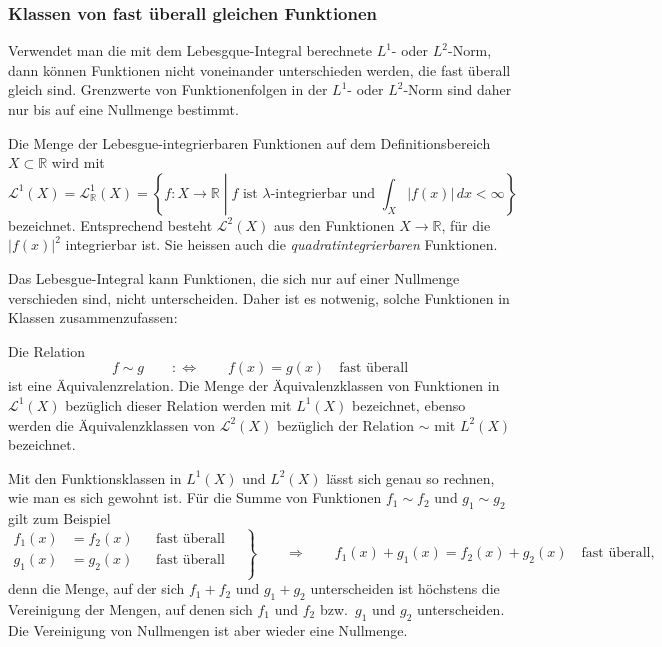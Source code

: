 %
%
\subsubsection{Klassen von fast überall gleichen Funktionen}
Verwendet man die mit dem Lebesgque-Integral berechnete $L^1$- oder
$L^2$-Norm, dann können Funktionen nicht voneinander unterschieden werden,
die fast überall gleich sind.
Grenzwerte von Funktionenfolgen in der $L^1$- oder $L^2$-Norm sind
daher nur bis auf eine Nullmenge bestimmt.

\begin{definition}
Die Menge der Lebesgue-integrierbaren Funktionen auf dem Definitionsbereich
$X\subset\mathbb{R}$ wird mit
\[
\mathscr{L}^1(X)
=
\mathscr{L}^1_{\mathbb{R}}(X)
=
\left\{ f\colon X\to \mathbb{R}
\;\left|\;
\text{$f$ ist $\lambda$-integrierbar und $\int_X|f(x)|\,dx< \infty$}
\right.\right\}
\]
bezeichnet.
%
%
%
%
Entsprechend besteht $\mathscr{L}^2(X)$ aus den Funktionen $X\to \mathbb{R}$,
für die $|f(x)|^2$ integrierbar ist.
Sie heissen auch die {\em quadratintegrierbaren} Funktionen.
\end{definition}

Das Lebesgue-Integral kann Funktionen, die sich nur auf einer Nullmenge
verschieden sind, nicht unterscheiden. 
Daher ist es notwenig, solche Funktionen in Klassen zusammenzufassen:

\begin{definition}
Die Relation
\[
f\sim g
\qquad:\Leftrightarrow \qquad f(x) = g(x)\quad\text{fast überall}
\]
ist eine Äquivalenzrelation.
Die Menge der Äquivalenzklassen von Funktionen in $\mathscr{L}^1(X)$
bezüglich dieser Relation werden mit $L^1(X)$ bezeichnet, ebenso werden
die Äquivalenzklassen von $\mathscr{L}^2(X)$ bezüglich der Relation $\sim$
mit $L^2(X)$ bezeichnet.
\end{definition}

Mit den Funktionsklassen in $L^1(X)$ und $L^2(X)$ lässt sich genau
so rechnen, wie man es sich gewohnt ist.
Für die Summe von Funktionen $f_1\sim f_2$ und $g_1\sim g_2$ gilt
zum Beispiel
\[
\left.
\begin{aligned}
f_1(x)&=f_2(x)&&\text{fast überall}\\
g_1(x)&=g_2(x)&&\text{fast überall}\\
\end{aligned}
\quad
\right\}
\qquad
\Rightarrow
\qquad
f_1(x)+g_1(x) = f_2(x)+g_2(x)\quad\text{fast überall},
\]
denn die Menge, auf der sich $f_1+f_2$ und $g_1+g_2$ unterscheiden
ist höchstens die Vereinigung der Mengen, auf denen sich $f_1$ und 
$f_2$ bzw.~$g_1$ und $g_2$ unterscheiden.
Die Vereinigung von Nullmengen ist aber wieder eine Nullmenge.

